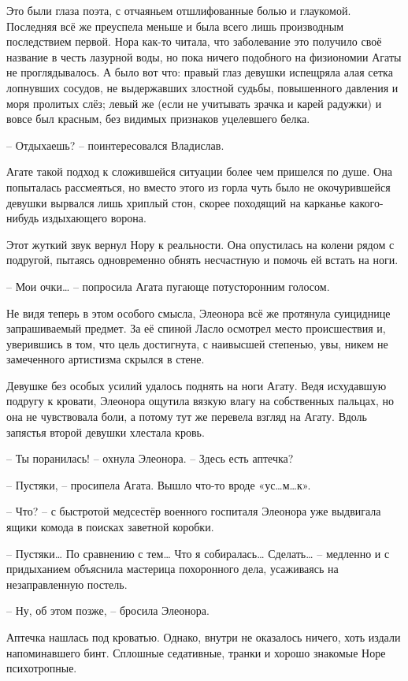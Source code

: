 \documentclass[
  a5paperpaper,
  DIV=11,
  numbers=noendperiod]{scrreprt}
\begin{document}
Это были глаза поэта, с отчаяньем отшлифованные болью и глаукомой.
Последняя всё же преуспела меньше и была всего лишь производным
последствием первой. Нора как-то читала, что заболевание это получило
своё название в честь лазурной воды, но пока ничего подобного на
физиономии Агаты не проглядывалось. А было вот что: правый глаз девушки
испещряла алая сетка лопнувших сосудов, не выдержавших злостной судьбы,
повышенного давления и моря пролитых слёз; левый же (если не учитывать
зрачка и карей радужки) и вовсе был красным, без видимых признаков
уцелевшего белка.

-- Отдыхаешь? -- поинтересовался Владислав.

Агате такой подход к сложившейся ситуации более чем пришелся по душе.
Она попыталась рассмеяться, но вместо этого из горла чуть было не
окочурившейся девушки вырвался лишь хриплый стон, скорее походящий на
карканье какого-нибудь издыхающего ворона.

Этот жуткий звук вернул Нору к реальности. Она опустилась на колени
рядом с подругой, пытаясь одновременно обнять несчастную и помочь ей
встать на ноги.

-- Мои очки\ldots{} -- попросила Агата пугающе потусторонним голосом.

Не видя теперь в этом особого смысла, Элеонора всё же протянула
суициднице запрашиваемый предмет. За её спиной Ласло осмотрел место
происшествия и, уверившись в том, что цель достигнута, с наивысшей
степенью, увы, никем не замеченного артистизма скрылся в стене.

Девушке без особых усилий удалось поднять на ноги Агату. Ведя исхудавшую
подругу к кровати, Элеонора ощутила вязкую влагу на собственных пальцах,
но она не чувствовала боли, а потому тут же перевела взгляд на Агату.
Вдоль запястья второй девушки хлестала кровь.

-- Ты поранилась! -- охнула Элеонора. -- Здесь есть аптечка?

-- Пустяки, -- просипела Агата. Вышло что-то вроде «ус\ldots м\ldots к».

-- Что? -- с быстротой медсестёр военного госпиталя Элеонора уже
выдвигала ящики комода в поисках заветной коробки.

-- Пустяки\ldots{} По сравнению с тем\ldots{} Что я собиралась\ldots{}
Сделать\ldots{} -- медленно и с придыханием объяснила мастерица
похоронного дела, усаживаясь на незаправленную постель.

-- Ну, об этом позже, -- бросила Элеонора.

Аптечка нашлась под кроватью. Однако, внутри не оказалось ничего, хоть
издали напоминавшего бинт. Сплошные седативные, транки и хорошо знакомые
Норе психотропные.
\end{document}
